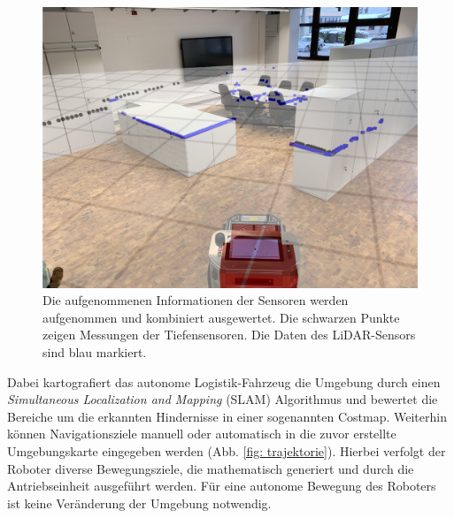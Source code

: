 \documentclass[12pt,a4paper,oneside,numbers=noenddot,headsepline,captions=tableheading,toc=bibliography,openany,tikz,margin=5mm]{scrbook}
\begin{document}
\begin{titlepage}
\begin{figure}[H]
	\includegraphics[width=\columnwidth]{match.pdf}
	\centering
	
	\caption{Die aufgenommenen Informationen der Sensoren werden aufgenommen und kombiniert ausgewertet. Die schwarzen Punkte zeigen Messungen der Tiefensensoren. Die Daten des LiDAR-Sensors sind blau markiert. }
	\label{fig: match}
\end{figure}


 Dabei kartografiert das autonome Logistik-Fahrzeug die Umgebung durch einen \textit{Simultaneous Localization and Mapping} (SLAM) Algorithmus und bewertet die Bereiche um die erkannten Hindernisse in einer sogenannten Costmap. Weiterhin können Navigationsziele manuell oder automatisch in die zuvor erstellte Umgebungskarte eingegeben werden (Abb. \ref{fig: trajektorie}). Hierbei verfolgt der Roboter diverse Bewegungsziele, die mathematisch generiert und durch die Antriebseinheit ausgeführt werden. Für eine autonome Bewegung des Roboters ist keine Veränderung der Umgebung notwendig.\newline
  



\end{titlepage}
\end{document}
